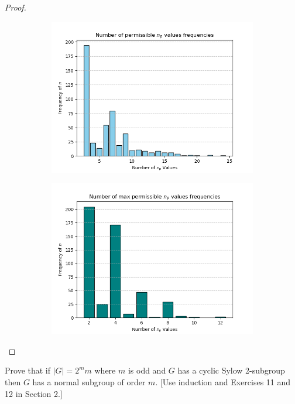 \documentclass{article}
\newenvironment{problem}[2][Problem]{\begin{trivlist}
\item[\hskip \labelsep {\bfseries #1}\hskip \labelsep {\bfseries #2.}]}{\end{trivlist}}
\begin{document}
\begin{proof}
\begin{center}
\begin{figure}[htbp]
    \begin{subfigure}{0.5\textwidth}
        \includegraphics[width=\linewidth]{picture/exercise 4.5.48-2.png}
 \end{subfigure}
 \begin{subfigure}{0.5\textwidth}
        \includegraphics[width=\linewidth]{picture/exercise 4.5.48-3.png}
 \end{subfigure}
\end{figure}
\end{center}
\end{proof}
\begin{problem}{49}
    Prove that if $|G| = 2^m m$ where $m$ is odd and $G$ has a cyclic Sylow 2-subgroup then $G$ has a normal subgroup of order $m$. [Use induction and Exercises 11 and 12 in Section 2.]
\end{problem}
\end{document}
